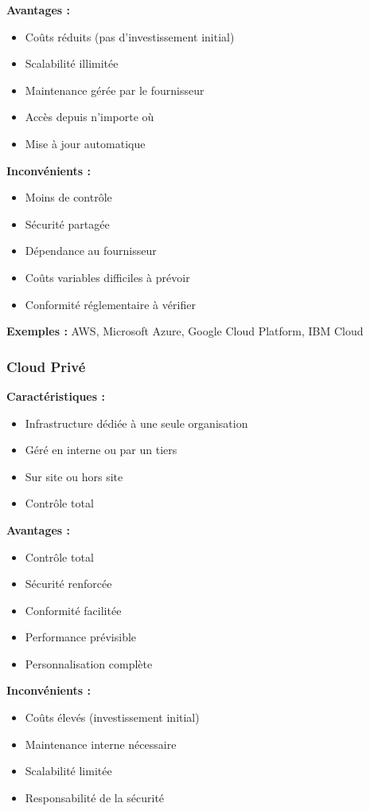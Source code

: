 \documentclass[11pt,a4paper]{article}
\begin{document}
\textbf{Avantages :}
\begin{itemize}
    \item Coûts réduits (pas d'investissement initial)
    \item Scalabilité illimitée
    \item Maintenance gérée par le fournisseur
    \item Accès depuis n'importe où
    \item Mise à jour automatique
\end{itemize}

\textbf{Inconvénients :}
\begin{itemize}
    \item Moins de contrôle
    \item Sécurité partagée
    \item Dépendance au fournisseur
    \item Coûts variables difficiles à prévoir
    \item Conformité réglementaire à vérifier
\end{itemize}

\textbf{Exemples :} AWS, Microsoft Azure, Google Cloud Platform, IBM Cloud

\subsubsection{Cloud Privé}

\textbf{Caractéristiques :}
\begin{itemize}
    \item Infrastructure dédiée à une seule organisation
    \item Géré en interne ou par un tiers
    \item Sur site ou hors site
    \item Contrôle total
\end{itemize}

\textbf{Avantages :}
\begin{itemize}
    \item Contrôle total
    \item Sécurité renforcée
    \item Conformité facilitée
    \item Performance prévisible
    \item Personnalisation complète
\end{itemize}

\textbf{Inconvénients :}
\begin{itemize}
    \item Coûts élevés (investissement initial)
    \item Maintenance interne nécessaire
    \item Scalabilité limitée
    \item Responsabilité de la sécurité
\end{itemize}
\end{document}

